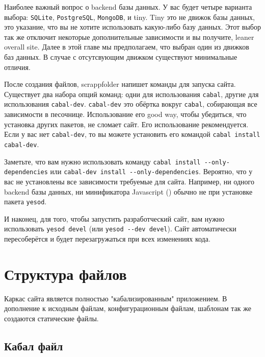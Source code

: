 Наиболее важный вопрос о backend базы данных. У вас будет четыре варианта 
выбора: \texttt{SQLite}, \texttt{PostgreSQL}, \texttt{MongoDB}, и tiny. 
Tiny это не движок базы данных, это указание, что вы не хотите использовать
какую-либо базу данных. Этот выбор так же отключит некоторые дополнительные
зависимости и вы получите, leaner overall site. Далее в этой главе мы предполагаем,
что выбран один из движков баз данных. В случае с отсутсвующим движком 
существуют минимальные отличия.

После создания файлов, scrappfolder напишет команды для запуска сайта.
Существует два набора опций команд: одни для использования \texttt{cabal},
другие для использования \texttt{cabal-dev}. \texttt{cabal-dev} это обёртка
вокруг \texttt{cabal}, собирающая все зависимости в песочнице. Использование
его good way, чтобы убедиться, что установка других пакетов, не сломает сайт.
Его использование рекомендуется. Если у вас нет \texttt{cabal-dev}, то вы можете
установить его командой \lstinline!cabal install cabal-dev!.

Заметьте, что вам нужно использовать команду \lstinline!cabal install --only-dependencies! 
или \lstinline!cabal-dev install --only-dependencies!. Вероятно, что у вас не 
установлены все зависимости требуемые для сайта. Например, ни одного backend
базы данных, ни минификатора Javascript ()
обычно не при установке пакета \texttt{yesod}.

И наконец, для того, чтобы запустить разработческий сайт, вам нужно использовать
\lstinline!yesod devel! (или \lstinline!yesod --dev devel!). Сайт автоматически
пересоберётся и будет перезагружаться при всех изменениях кода.

\section{Структура файлов}

Каркас сайта является полностью "кабализированным" приложением. В дополнение
к исходным файлам, конфигурационным файлам, шаблонам так же создаются статические файлы.

\subsection{Кабал файл}


